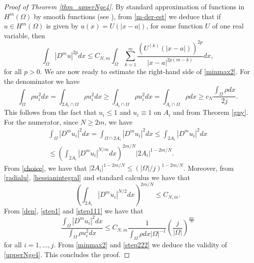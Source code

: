 \documentclass[11pt,a4paper]{amsart}
\numberwithin{equation}{section}
\begin{document}
\begin{proof}[Proof of Theorem \ref{thm_upperNge4}]
By standard approximation of functions in $H^m(\Omega)$ by smooth functions (see \cite[\S\,5.3]{evans}), from \eqref{m-der-est} we deduce that if $u\in H^m(\Omega)$ is given by $u(x)=U(|x-a|)$, for some function $U$ of one real variable, then
\begin{equation}\label{hessianintegral}
\int_{\Omega}|D^mu|^{2p}dx\leq C_{N,m}\int_{\Omega}\sum_{k=1}^m\frac{(U^{(k)}(|x-a|))^{2p}}{|x-a|^{2p(m-k)}} dx,
\end{equation}
for all $p>0$. We are now ready to estimate the right-hand side of \eqref{minmax2}. For the denominator we have
\begin{equation}\label{den}
\int_{\Omega}\rho u_i^2dx=\int_{2A_i\cap\Omega}\rho u_i^2dx\geq\int_{A_i\cap\Omega}\rho u_i^2dx=\int_{A_i\cap\Omega}\rho dx\geq c_N\frac{\int_{\Omega}\rho dx}{2j}.
\end{equation}
This follows from the fact that $u_i\leq 1$ and $u_i\equiv 1$ on $A_i$ and from Theorem \ref{gny}. For the numerator, since $N\geq 2m$, we have
\begin{multline}\label{step1}
\int_{\Omega}|D^mu_i|^2dx=\int_{\Omega\cap 2A_i}|D^mu_i|^2dx\leq\int_{2A_i}|D^mu_i|^2dx\\
\leq\left(\int_{2A_i}|D^mu_i|^{N/m}dx\right)^{2m/N}|2A_i|^{1-2m/N}.
\end{multline}
From \eqref{choice}, we have that $|2A_i|^{1-2m/N}\leq\left({|\Omega|}/{j}\right)^{1-2m/N}$. Moreover, from \eqref{radialu}, \eqref{hessianintegral} and standard calculus we have that
\begin{equation}\label{step111}
\left(\int_{2A_i}|D^mu_i|^{N/2}dx\right)^{2m/N}\leq C_{N,m}.
\end{equation}
From \eqref{den}, \eqref{step1} and \eqref{step111} we have that
\begin{equation}\label{step222}
\frac{\int_{\Omega}|D^m u_i|^2dx}{\int_{\Omega}\rho u_i^2dx}\leq C_{N,m}\frac{1}{\int_{\Omega}\rho dx|\Omega|^{-1}}\left(\frac{j}{|\Omega|}\right)^{\frac{2m}{N}}
\end{equation}
for all $i=1,...,j$. From \eqref{minmax2} and \eqref{step222} we deduce the validity of \eqref{upperNge4}. This concludes the proof.
\end{proof}





\end{document}
